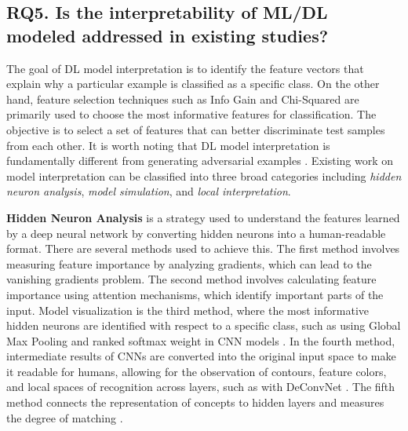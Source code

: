 \subsection{RQ5. Is the interpretability of ML/DL modeled addressed in existing studies?}




The goal of DL model interpretation is to identify the feature vectors that explain why a particular example is classified as a specific class. On the other hand, feature selection techniques such as Info Gain \cite{i32} and Chi-Squared \cite{i18} are primarily used to choose the most informative features for classification. The objective is to select a set of features that can better discriminate test samples from each other. It is worth noting that DL model interpretation is fundamentally different from generating adversarial examples \cite{i48, i50}. %
Existing work on model interpretation can be classified into three broad categories including \textit{hidden neuron analysis}, \textit{model simulation}, and \textit{local interpretation}. 

\textbf{Hidden Neuron Analysis} is a strategy used to understand the features learned by a deep neural network by converting hidden neurons into a human-readable format. There are several methods used to achieve this. The first method \cite{i24, i42} involves measuring feature importance by analyzing gradients, which can lead to the vanishing gradients problem. The second method \cite{i43, i44, i47, i8} involves calculating feature importance using attention mechanisms, which identify important parts of the input. Model visualization is the third method, where the most informative hidden neurons are identified with respect to a specific class, such as using Global Max Pooling and ranked softmax weight in CNN models \cite{i52}. In the fourth method, intermediate results of CNNs are converted into the original input space to make it readable for humans, allowing for the observation of contours, feature colors, and local spaces of recognition across layers, such as with DeConvNet \cite{i49}. The fifth method connects the representation of concepts to hidden layers and measures the degree of matching \cite{i7}.

